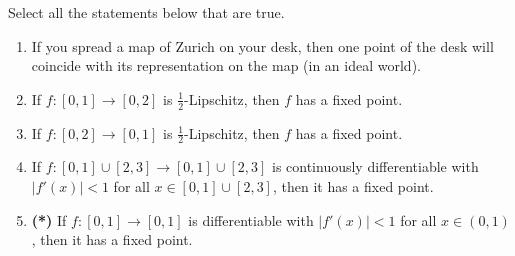 
\begin{exercise}
\label{ex:3.5}
Select all the statements below that are true.
\begin{enumerate}[label=\textbf{(\alph*)}]
  \item If you spread a map of Zurich on your desk, then one point of the desk will coincide with
    its representation on the map (in an ideal world).
  \item If $f : [0,1] \to [0,2]$ is $\tfrac{1}{2}$-Lipschitz, then $f$ has a fixed point.
  \item If $f : [0,2] \to [0,1]$ is $\tfrac{1}{2}$-Lipschitz, then $f$ has a fixed point.
  \item If $f : [0,1] \cup [2,3] \to [0,1] \cup [2,3]$ is continuously differentiable with
    $|f'(x)| < 1$ for all $x \in [0,1]\cup[2,3]$, then it has a fixed point.
  \item \textbf{(*)} If $f : [0,1] \to [0,1]$ is differentiable with $|f'(x)| < 1$ for all
    $x \in (0,1)$, then it has a fixed point.
\end{enumerate}
\end{exercise}
